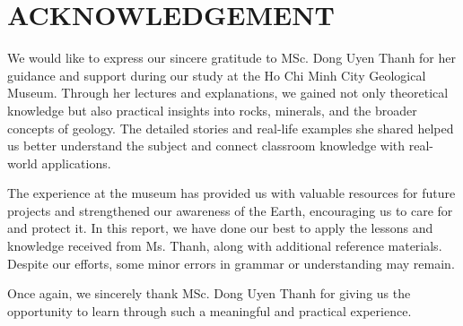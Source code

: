 \section*{ACKNOWLEDGEMENT}

We would like to express our sincere gratitude to MSc. Dong Uyen Thanh for her guidance and support during our study at the Ho Chi Minh City Geological Museum. Through her lectures and explanations, we gained not only theoretical knowledge but also practical insights into rocks, minerals, and the broader concepts of geology. The detailed stories and real-life examples she shared helped us better understand the subject and connect classroom knowledge with real-world applications.

The experience at the museum has provided us with valuable resources for future projects and strengthened our awareness of the Earth, encouraging us to care for and protect it. In this report, we have done our best to apply the lessons and knowledge received from Ms. Thanh, along with additional reference materials. Despite our efforts, some minor errors in grammar or understanding may remain.

Once again, we sincerely thank MSc. Dong Uyen Thanh for giving us the opportunity to learn through such a meaningful and practical experience.

\clearpage
